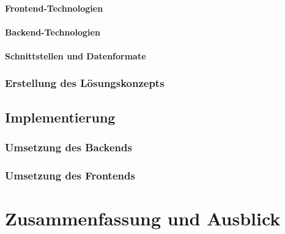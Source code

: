 \subsubsection{Frontend-Technologien}
\subsubsection{Backend-Technologien}
\subsubsection{Schnittstellen und Datenformate}

\subsection{Erstellung des Lösungskonzepts}

\section{Implementierung}
\subsection{Umsetzung des Backends}
\subsection{Umsetzung des Frontends}

\chapter{Zusammenfassung und Ausblick}